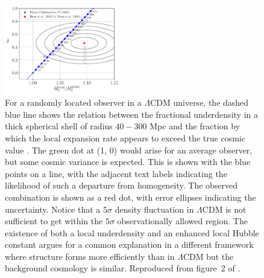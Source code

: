 \documentclass[fleqn,usenatbib,useAMS]{mnras} %
\begin{document}
\begin{figure}
	\centering
	\includegraphics[width=0.45\textwidth]{Haslbauer_2020_Figure_2}
	\caption{For a randomly located observer in a $\Lambda$CDM universe, the dashed blue line shows the relation between the fractional underdensity in a thick spherical shell of radius $40-300$ Mpc and the fraction by which the local expansion rate appears to exceed the true cosmic value \citep{Planck_2020}. The green dot at (1, 0) would arise for an average observer, but some cosmic variance is expected. This is shown with the blue points on a line, with the adjacent text labels indicating the likelihood of such a departure from homogeneity. The observed combination is shown as a red dot, with error ellipses indicating the uncertainty. Notice that a $5\sigma$ density fluctuation in $\Lambda$CDM is not sufficient to get within the $5\sigma$ observationally allowed region. The existence of both a local underdensity and an enhanced local Hubble constant \citep{Riess_2019, Wong_2020} argues for a common explanation in a different framework where structure forms more efficiently than in $\Lambda$CDM but the background cosmology is similar. Reproduced from figure~2 of \citet{Haslbauer_2020}.}
	\label{Haslbauer_2020_Figure_2}
\end{figure}
\end{document}
